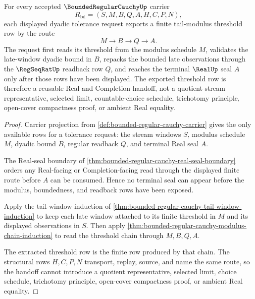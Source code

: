 \begin{theorem}
\label{thm:bounded-regular-cauchy-tail-modulus-extraction}
For every accepted $\BoundedRegularCauchyUp$ carrier
$$
R_{\mathrm{bd}}=(S,M,B,Q,A,H,C,P,N),
$$
each displayed dyadic tolerance request exports a finite tail-modulus threshold row by the route
$$
M \longrightarrow B \longrightarrow Q \longrightarrow A .
$$
The request first reads its threshold from the modulus schedule $M$, validates the late-window dyadic bound in $B$, repacks the bounded late observations through the $\RegSeqRatUp$ readback row $Q$, and reaches the terminal $\RealUp$ seal $A$ only after those rows have been displayed. The exported threshold row is therefore a reusable Real and Completion handoff, not a quotient stream representative, selected limit, countable-choice schedule, trichotomy principle, open-cover compactness proof, or ambient Real equality.
\end{theorem}
\begin{proof}
Carrier projection from \autoref{def:bounded-regular-cauchy-carrier} gives the only available rows for a tolerance request: the stream windows $S$, modulus schedule $M$, dyadic bound $B$, regular readback $Q$, and terminal Real seal $A$.

The Real-seal boundary of \autoref{thm:bounded-regular-cauchy-real-seal-boundary} orders any Real-facing or Completion-facing read through the displayed finite route before $A$ can be consumed. Hence no terminal seal can appear before the modulus, boundedness, and readback rows have been exposed.

Apply the tail-window induction of \autoref{thm:bounded-regular-cauchy-tail-window-induction} to keep each late window attached to its finite threshold in $M$ and its displayed observations in $S$. Then apply \autoref{thm:bounded-regular-cauchy-modulus-chain-induction} to read the threshold chain through $M,B,Q,A$.

The extracted threshold row is the finite row produced by that chain. The structural rows $H,C,P,N$ transport, replay, source, and name the same route, so the handoff cannot introduce a quotient representative, selected limit, choice schedule, trichotomy principle, open-cover compactness proof, or ambient Real equality.
\end{proof}

